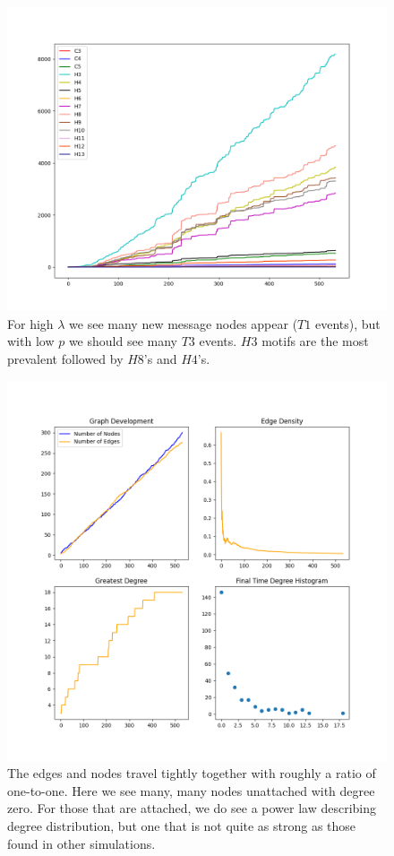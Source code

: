 \begin{figure}[h!]
    \includegraphics[width=15cm]{Images/twitter_sim_for_stats_3_0.8_0.2.png}
    \centering
    \caption{For high $\lambda$ we see many new message nodes appear ($T1$ events), but
    with low $p$ we should see many $T3$ events. $H3$ motifs are the most prevalent
    followed by $H8$'s and $H4$'s.}
    \label{fig:thij0802}
\end{figure}

\begin{figure}[h!]
    \includegraphics[width=14cm]{Images/twitter_sim_stats_3_0.8_0.2.png}
    \centering
    \caption{The edges and nodes travel tightly together with roughly a ratio of 
     one-to-one. Here we see many, many nodes unattached with degree zero.
    For those that are attached, we do see a power law describing degree distribution, but one that is not quite
    as strong as those found in other simulations.}
    \label{fig:stats0802}
\end{figure}


